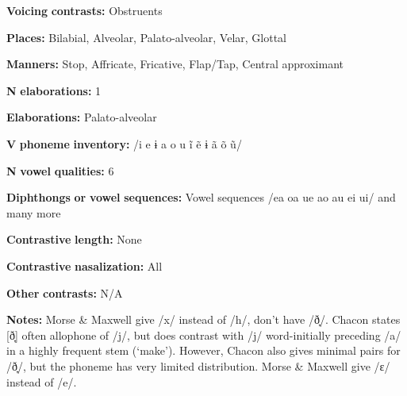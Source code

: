 \begin{styleBody}
\textbf{Voicing} \textbf{contrasts:} Obstruents
\end{styleBody}

\begin{styleBody}
\textbf{Places:} Bilabial, Alveolar, Palato-alveolar, Velar, Glottal
\end{styleBody}

\begin{styleBody}
\textbf{Manners:} Stop, Affricate, Fricative, Flap/Tap, Central approximant
\end{styleBody}

\begin{styleBody}
\textbf{N} \textbf{elaborations:} 1
\end{styleBody}

\begin{styleBody}
\textbf{Elaborations:} Palato-alveolar
\end{styleBody}

\begin{styleBody}
\textbf{V} \textbf{phoneme} \textbf{inventory:} /i e ɨ a o u ĩ ẽ ɨ ã õ ũ/
\end{styleBody}

\begin{styleBody}
\textbf{N} \textbf{vowel} \textbf{qualities:} 6
\end{styleBody}

\begin{styleBody}
\textbf{Diphthongs} \textbf{or} \textbf{vowel} \textbf{sequences:} Vowel sequences /ea oa ue ao au ei ui/ and many more
\end{styleBody}

\begin{styleBody}
\textbf{Contrastive} \textbf{length:} None
\end{styleBody}

\begin{styleBody}
\textbf{Contrastive} \textbf{nasalization:} All
\end{styleBody}

\begin{styleBody}
\textbf{Other} \textbf{contrasts:} N/A
\end{styleBody}

\begin{styleBody}
\textbf{Notes:} Morse \& Maxwell give /x/ instead of /h/, don’t have /ð̞/. Chacon states [ð̞] often allophone of /j/, but does contrast with /j/ word-initially preceding /a/ in a highly frequent stem (‘make’). However, Chacon also gives minimal pairs for /ð̞/, but the phoneme has very limited distribution. Morse \& Maxwell give /ɛ/ instead of /e/.
\end{styleBody}

